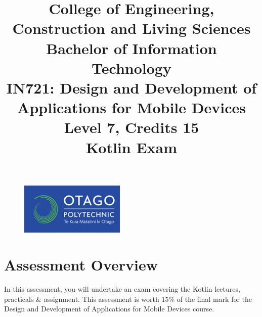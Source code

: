 \documentclass{article}
\author{}
\begin{document}
\begin{figure}
	\centering
	\includegraphics[width=50mm]{./img/logo.png} 
\end{figure}

\title{College of Engineering, Construction and Living Sciences\\Bachelor of Information Technology\\IN721: Design and Development of Applications for Mobile Devices\\Level 7, Credits 15\\\textbf{Kotlin Exam}}
\date{}
\maketitle

\section*{Assessment Overview}
In this assessment, you will undertake an exam covering the Kotlin lectures, practicals \& assignment. This assessment is worth 15\% of the final mark for the Design and Development of Applications for Mobile Devices course. 
\end{document}
